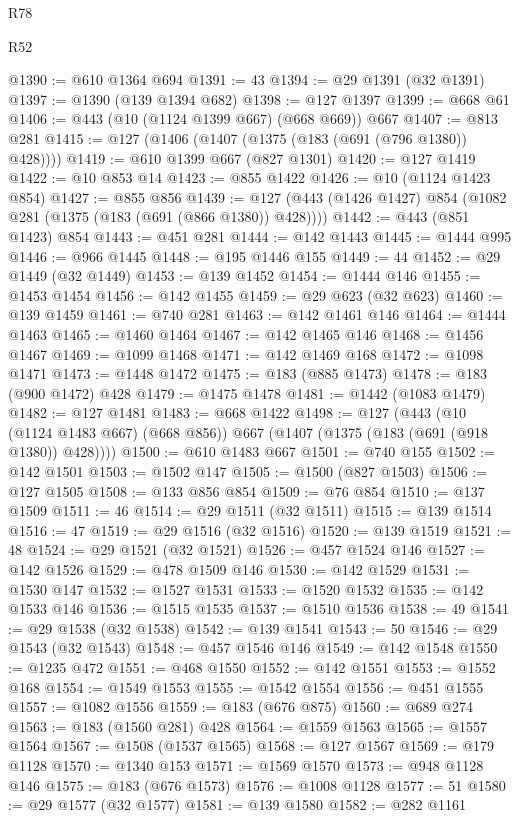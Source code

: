\begin{lexlean}{R78}
\begin{lexlean}{R52}
\begin{coremodule}
{{{{{{{{{{{{{{{{{{{{{{{{{{{{{{{{{{{{{{{{{{{{{{{{{{{{{{{{{{{{{{{{{{{{{{{{{{{{{{{{{{{{{{{{{{{{{{{{{{{{{{{{{{{{{{{{{{{{{{{{{{{{{{{{{{{{{{{{{{{{{{{{{{{{{{{{{{{{{{{{{{{{{{{{{{{{{{{{{{{{{{{{{{{{{{{{{{{{{{@1390 := @610 @1364 @694
@1391 := 43
@1394 := @29 @1391 (@32 @1391)
@1397 := @1390 (@139 @1394 @682)
@1398 := @127 @1397
@1399 := @668 @61
@1406 := @443 (@10 (@1124 @1399 @667) (@668 @669)) @667
@1407 := @813 @281
@1415 := @127 (@1406 (@1407 (@1375 (@183 (@691 (@796 @1380)) @428))))
@1419 := @610 @1399 @667 (@827 @1301)
@1420 := @127 @1419
@1422 := @10 @853 @14
@1423 := @855 @1422
@1426 := @10 (@1124 @1423 @854)
@1427 := @855 @856
@1439 := @127 (@443 (@1426 @1427) @854 (@1082 @281 (@1375 (@183 (@691 (@866 @1380)) @428))))
@1442 := @443 (@851 @1423) @854
@1443 := @451 @281
@1444 := @142 @1443
@1445 := @1444 @995
@1446 := @966 @1445
@1448 := @195 @1446 @155
@1449 := 44
@1452 := @29 @1449 (@32 @1449)
@1453 := @139 @1452
@1454 := @1444 @146
@1455 := @1453 @1454
@1456 := @142 @1455
@1459 := @29 @623 (@32 @623)
@1460 := @139 @1459
@1461 := @740 @281
@1463 := @142 @1461 @146
@1464 := @1444 @1463
@1465 := @1460 @1464
@1467 := @142 @1465 @146
@1468 := @1456 @1467
@1469 := @1099 @1468
@1471 := @142 @1469 @168
@1472 := @1098 @1471
@1473 := @1448 @1472
@1475 := @183 (@885 @1473)
@1478 := @183 (@900 @1472) @428
@1479 := @1475 @1478
@1481 := @1442 (@1083 @1479)
@1482 := @127 @1481
@1483 := @668 @1422
@1498 := @127
    (@443 (@10 (@1124 @1483 @667) (@668 @856)) @667 (@1407 (@1375 (@183 (@691 (@918 @1380)) @428))))
@1500 := @610 @1483 @667
@1501 := @740 @155
@1502 := @142 @1501
@1503 := @1502 @147
@1505 := @1500 (@827 @1503)
@1506 := @127 @1505
@1508 := @133 @856 @854
@1509 := @76 @854
@1510 := @137 @1509
@1511 := 46
@1514 := @29 @1511 (@32 @1511)
@1515 := @139 @1514
@1516 := 47
@1519 := @29 @1516 (@32 @1516)
@1520 := @139 @1519
@1521 := 48
@1524 := @29 @1521 (@32 @1521)
@1526 := @457 @1524 @146
@1527 := @142 @1526
@1529 := @478 @1509 @146
@1530 := @142 @1529
@1531 := @1530 @147
@1532 := @1527 @1531
@1533 := @1520 @1532
@1535 := @142 @1533 @146
@1536 := @1515 @1535
@1537 := @1510 @1536
@1538 := 49
@1541 := @29 @1538 (@32 @1538)
@1542 := @139 @1541
@1543 := 50
@1546 := @29 @1543 (@32 @1543)
@1548 := @457 @1546 @146
@1549 := @142 @1548
@1550 := @1235 @472
@1551 := @468 @1550
@1552 := @142 @1551
@1553 := @1552 @168
@1554 := @1549 @1553
@1555 := @1542 @1554
@1556 := @451 @1555
@1557 := @1082 @1556
@1559 := @183 (@676 @875)
@1560 := @689 @274
@1563 := @183 (@1560 @281) @428
@1564 := @1559 @1563
@1565 := @1557 @1564
@1567 := @1508 (@1537 @1565)
@1568 := @127 @1567
@1569 := @179 @1128
@1570 := @1340 @153
@1571 := @1569 @1570
@1573 := @948 @1128 @146
@1575 := @183 (@676 @1573)
@1576 := @1008 @1128
@1577 := 51
@1580 := @29 @1577 (@32 @1577)
@1581 := @139 @1580
@1582 := @282 @1161
}}}}}}}}}}}}}}}}}}}}}}}}}}}}}}}}}}}}}}}}}}}}}}}}}}}}}}}}}}}}}}}}}}}}}}}}}}}}}}}}}}}}}}}}}}}}}}}}}}}}}}}}}}}}}}}}}}}}}}}}}}}}}}}}}}}}}}}}}}}}}}}}}}}}}}}}}}}}}}}}}}}}}}}}}}}}}}}}}}}}}}}}}}}}}}}}}}}}}}
\end{coremodule}
\end{lexlean}
\end{lexlean}

